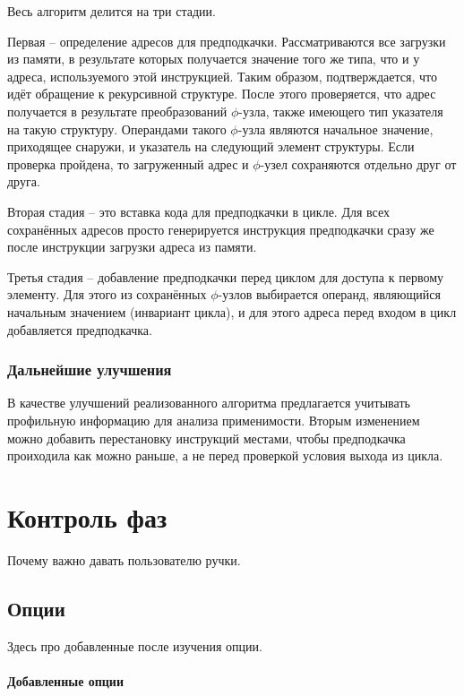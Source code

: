 \documentclass[12pt,a4paper]{article}
\begin{document}
\indent

Весь алгоритм делится на три стадии.

Первая -- определение адресов для предподкачки. Рассматриваются все загрузки из памяти, в результате которых получается значение того же типа, что и у адреса, используемого этой инструкцией. Таким образом, подтверждается, что идёт обращение к рекурсивной структуре. После этого проверяется, что адрес получается в результате преобразований $\phi$-узла, также имеющего тип указателя на такую структуру. Операндами такого $\phi$-узла являются начальное значение, приходящее снаружи, и указатель на следующий элемент структуры. Если проверка пройдена, то загруженный адрес и $\phi$-узел сохраняются отдельно друг от друга.

Вторая стадия -- это вставка кода для предподкачки в цикле. Для всех сохранённых адресов просто генерируется инструкция предподкачки сразу же после инструкции загрузки адреса из памяти.

Третья стадия -- добавление предподкачки перед циклом для доступа к первому элементу. Для этого из сохранённых $\phi$-узлов выбирается операнд, являющийся начальным значением (инвариант цикла), и для этого адреса перед входом в цикл добавляется предподкачка.

\subsubsection{Дальнейшие улучшения}

\indent

В качестве улучшений реализованного алгоритма предлагается учитывать профильную информацию для анализа применимости. Вторым изменением можно добавить перестановку инструкций местами, чтобы предподкачка проиходила как можно раньше, а не перед проверкой условия выхода из цикла.

\section{Контроль фаз}

Почему важно давать пользователю ручки.

\subsection{Опции}

Здесь про добавленные после изучения опции.

\paragraph{Добавленные опции}
\end{document}
